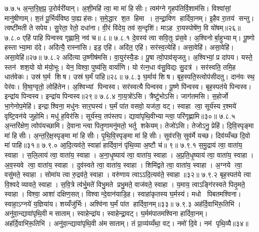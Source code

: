 ७.७.५
अ॒न्त॒रि॒क्ष॒प्र॒ उ॒रोर्वरी॑यान्। अ॒शी॒महि॑ त्वा॒ मा मा॑ हिसीः। त्वम॑ग्ने गृ॒हप॑तिर्वि॒शाम॑सि। विश्वा॑सां॒ मानु॑षीणाम्। श॒तं पू॒र्भिर्य॑विष्ठ पा॒ह्यह॑सः। स॒मे॒द्धार श॒त हिमा। त॒न्द्रा॒विण हार्दिवा॒नम्। इ॒हैव रा॒तय॑ सन्तु। त्वष्टी॑मती ते सपेय। सु॒रेता॒ रेतो॒ दधा॑ना। वी॒रं  वि॑देय॒ तव॑ स॒न्दृशि॑। माऽह रा॒यस्पोषे॑ण॒ वि यो॑षम्॥२६॥
७.८.०
एहि॑ पाहि पिन्वस्व गृह्णामि॒ नव॑ च॥ ८॥
\anuvakamend
७.८.१
दे॒वस्य॑ त्वा सवि॒तुः प्र॑स॒वे। अ॒श्विनोर्बा॒हुभ्याम्। पू॒ष्णो हस्ताभ्या॒मा द॑दे। अदि॑त्यै॒ रास्ना॑सि। इड॒ एहि॑। अदि॑त॒ एहि॑। सर॑स्व॒त्येहि॑। असा॒वेहि॑। असा॒वेहि॑। असा॒वेहि॑॥२७॥
७.८.२
अदि॑त्या उ॒ष्णीष॑मसि। वा॒युर॑स्यै॒डः। पू॒षा त्वो॒पाव॑सृजतु। अ॒श्विभ्यां॒ प्र दा॑पय। यस्ते॒ स्तन॑ शश॒यो यो म॑यो॒भूः। येन॒ विश्वा॒ पुष्य॑सि॒ वार्या॑णि। यो र॑त्न॒धा व॑सु॒विद्यः सु॒दत्र॑। सर॑स्वति॒ तमि॒ह धात॑वेकः। उस्र॑ घ॒र्म शिष। उस्र॑ घ॒र्मं पा॑हि॥२८॥
७.८.३
घ॒र्माय॑ शिष। बृह॒स्पति॒स्त्वोप॑सीदतु। दान॑वः स्थ॒ पेर॑वः। वि॒ष्व॒ग्वृतो॒ लोहि॑तेन। अ॒श्विभ्यां पिन्वस्व। सर॑स्वत्यै पिन्वस्व। पू॒ष्णे पि॑न्वस्व। बृह॒स्पत॑ये पिन्वस्व। इन्द्रा॑य पिन्वस्व। इन्द्रा॑य पिन्वस्व॥२९॥
७.८.४
गा॒य॒त्रो॑ऽसि। त्रैष्टु॑भोऽसि। जाग॑तमसि। स॒होर्जो भा॒गेनोप॒मेहि॑। इन्द्राश्विना॒ मधु॑नः सार॒घस्य॑। घ॒र्मं पा॑त वसवो॒ यज॑ता॒ वट्। स्वाहा त्वा॒ सूर्य॑स्य र॒श्मये॑ वृष्टि॒वन॑ये जुहोमि। मधु॑ ह॒विर॑सि। सूर्य॑स्य॒ तप॑स्तप। द्यावा॑पृथि॒वीभ्यान्त्वा॒ परि॑गृह्णामि॥३०॥
७.८.५
अ॒न्तरि॑क्षेण॒ त्वोप॑यच्छामि। दे॒वानान्त्वा पितृ॒णामनु॑मतो॒ भर्तु शकेयम्। तेजो॑ऽसि। तेजोऽनु॒ प्रेहि॑। दि॒वि॒स्पृङ्मा मा॑ हिसीः। अ॒न्त॒रि॒क्ष॒स्पृङ्मा मा॑ हिसीः। पृ॒थि॒वि॒स्पृङ्मा मा॑ हिसीः। सुव॑रसि॒ सुव॑र्मे यच्छ। दिव॑य्यँच्छ दि॒वो मा॑ पाहि॥३१॥
७.९.०
आ॒दि॒त्यव॑ते॒ स्वाहा॑ हार्दिवा॒नं पृ॑थि॒व्या अ॒ष्टौ च॑॥ ९॥
\anuvakamend
७.९.१
स॒मु॒द्राय॑ त्वा॒ वाता॑य॒ स्वाहा। स॒लि॒लाय॑ त्वा॒ वाता॑य॒ स्वाहा। अ॒ना॒धृ॒ष्याय॑ त्वा॒ वाता॑य॒ स्वाहा। अ॒प्र॒ति॒धृ॒ष्याय॑ त्वा॒ वाता॑य॒ स्वाहा। अ॒व॒स्यवे त्वा॒ वाता॑य॒ स्वाहा। दुव॑स्वते त्वा॒ वाता॑य॒ स्वाहा। शिमि॑द्वते त्वा॒ वाता॑य॒ स्वाहा। अ॒ग्नये त्वा॒ वसु॑मते॒ स्वाहा। सोमा॑य त्वा रु॒द्रव॑ते॒ स्वाहा। वरु॑णाय त्वाऽऽदि॒त्यव॑ते॒ स्वाहा॥३२॥
७.९.२
बृह॒स्पत॑ये त्वा वि॒श्वदेव्यावते॒ स्वाहा। स॒वि॒त्रे त्व॑र्भु॒मते॑ विभु॒मते प्रभु॒मते॒ वाज॑वते॒ स्वाहा। य॒माय॒ त्वाऽङ्गि॑रस्वते पितृ॒मते॒ स्वाहा। विश्वा॒ आशा॑ दक्षिण॒सत्। विश्वान्दे॒वान॑याडि॒ह। स्वाहा॑कृतस्य घ॒र्मस्य॑। मधो पिबतमश्विना। स्वाहा॒ऽग्नये॑ य॒ज्ञिया॑य। शय्यँजु॑र्भिः। अश्वि॑ना घ॒र्मं पा॑त हार्दिवा॒नम्॥३३॥
७.९.३
अह॑र्दि॒वाभि॑रू॒तिभि॑। अनु॑वा॒न्द्यावा॑पृथि॒वी मसाताम्। स्वाहेन्द्रा॑य। स्वाहेन्द्रा॒वट्। घ॒र्मम॑पातमश्विना हार्दिवा॒नम्। अह॑र्दि॒वाभि॑रू॒तिभि॑। अनु॑वा॒न्द्यावा॑पृथि॒वी अ॑मसाताम्। तं प्रा॒व्य॑य्यँथा॒ वट्। नमो॑ दि॒वे। नम॑ पृथि॒व्यै॥३४॥
